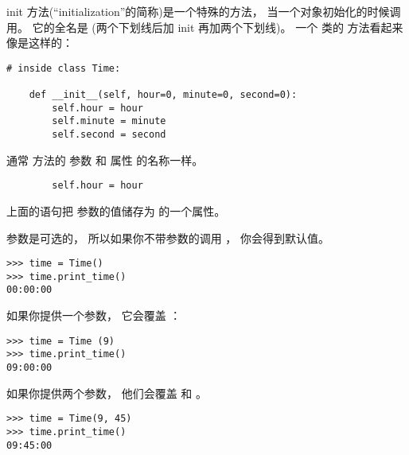 init 方法(``initialization''的简称)是一个特殊的方法，
当一个对象初始化的时候调用。
它的全名是  (两个下划线后加 init 再加两个下划线)。
一个  类的  方法看起来像是这样的：

\begin{lstlisting}
# inside class Time:

    def __init__(self, hour=0, minute=0, second=0):
        self.hour = hour
        self.minute = minute
        self.second = second
\end{lstlisting}

%

通常  方法的 参数 和 属性 的名称一样。


\begin{lstlisting}
        self.hour = hour
\end{lstlisting}

%

上面的语句把  参数的值储存为  的一个属性。
  
  


参数是可选的， 所以如果你不带参数的调用  ， 你会得到默认值。

\begin{lstlisting}
>>> time = Time()
>>> time.print_time()
00:00:00
\end{lstlisting}

%

如果你提供一个参数， 它会覆盖  ：

\begin{lstlisting}
>>> time = Time (9)
>>> time.print_time()
09:00:00
\end{lstlisting}

%

如果你提供两个参数， 他们会覆盖  和  。

\begin{lstlisting}
>>> time = Time(9, 45)
>>> time.print_time()
09:45:00
\end{lstlisting}

